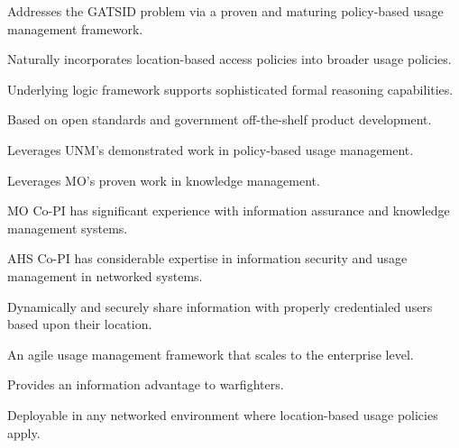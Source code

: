 \documentclass{sbir}
\begin{document}
\begin{evalbox}
  \begin{evalitemize}
     \item Addresses the GATSID problem via a proven and maturing policy-based usage management framework.
     \item Naturally incorporates location-based access policies into broader usage policies.
     \item Underlying logic framework supports sophisticated formal reasoning capabilities.
  \end{evalitemize}
  \begin{evalitemize}
     \item Based on open standards and government off-the-shelf product development.
     \item Leverages UNM's demonstrated work in policy-based usage management.
     \item Leverages MO's proven work in knowledge management.
  \end{evalitemize}
  \begin{evalitemize}
     \item MO Co-PI has significant experience with information assurance and knowledge management systems.
     \item AHS Co-PI has considerable expertise in information security and usage management in networked systems.
  \end{evalitemize}
  \begin{evalitemize}
     \item Dynamically and securely share information with properly credentialed users based upon their location.
     \item An agile usage management framework that scales to the enterprise level.
     \item Provides an information advantage to warfighters.
  \end{evalitemize}
  \begin{evalitemize}
     \item Deployable in any networked environment where location-based usage policies apply.
  \end{evalitemize}
\end{evalbox}
\end{document}
